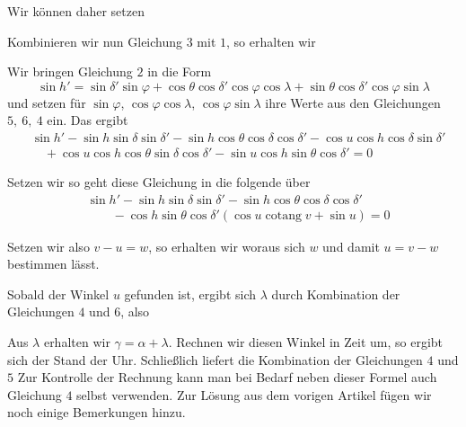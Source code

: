 Wir können daher setzen

\SourceGathering{6\textsuperscript{*}}Kombinieren wir nun Gleichung $3$ mit $1$, so erhalten wir

Wir bringen Gleichung $2$ in die Form
\[
\sin h'=\sin\delta'\sin\varphi+\cos\theta\cos\delta'\cos\varphi\cos\lambda+\sin\theta\cos\delta'\cos\varphi\sin\lambda
\]
und setzen für $\sin\varphi$, $\cos\varphi\cos\lambda$, $\cos\varphi\sin\lambda$ ihre Werte aus den Gleichungen $5,\ 6,\ 4$ ein. Das ergibt
\[
\begin{aligned}
&\sin h'-\sin h\sin\delta\sin\delta'-\sin h\cos\theta\cos\delta\cos\delta'-\cos u\cos h\cos\delta\sin\delta'\\
&\quad+\cos u\cos h\cos\theta\sin\delta\cos\delta'-\sin u\cos h\sin\theta\cos\delta'=0
\end{aligned}
\]

Setzen wir
so geht diese Gleichung in die folgende über
\[
\begin{aligned}
&\sin h'-\sin h\sin\delta\sin\delta'-\sin h\cos\theta\cos\delta\cos\delta'\\
&\qquad-\cos h\sin\theta\cos\delta'(\cos u\operatorname{cotang}v+\sin u)=0
\end{aligned}
\]

Setzen wir also $v-u=w$, so erhalten wir
woraus sich $w$ und damit $u=v-w$ bestimmen lässt.

Sobald der Winkel $u$ gefunden ist, ergibt sich $\lambda$ durch Kombination der Gleichungen $4$ und $6$, also

Aus $\lambda$ erhalten wir $\gamma=\alpha+\lambda$. Rechnen wir diesen Winkel in Zeit um, so ergibt sich der Stand der Uhr. Schließlich liefert die Kombination der Gleichungen $4$ und $5$
Zur Kontrolle der Rechnung kann man bei Bedarf neben dieser Formel auch Gleichung $4$ selbst verwenden.
Zur Lösung aus dem vorigen Artikel fügen wir noch einige Bemerkungen hinzu.

